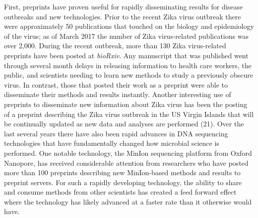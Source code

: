 \documentclass[11pt,]{article}
\begin{document}
First, preprints have proven useful for rapidly disseminating results
for disease outbreaks and new technologies. Prior to the recent Zika
virus outbreak there were approximately 50 publications that touched on
the biology and epidemiology of the virus; as of March 2017 the number
of Zika virus-related publications was over 2,000. During the recent
outbreak, more than 130 Zika virus-related preprints have been posted at
\emph{bioRxiv}. Any manuscript that was published went through several
month delays in releasing information to health care workers, the
public, and scientists needing to learn new methods to study a
previously obscure virus. In contrast, those that posted their work as a
preprint were able to disseminate their methods and results instantly.
Another interesting use of preprints to disseminate new information
about Zika virus has been the posting of a preprint describing the Zika
virus outbreak in the US Virgin Islands that will be continually updated
as new data and analyses are performed (21). Over the last several years
there have also been rapid advances in DNA sequencing technologies that
have fundamentally changed how microbial science is performed. One
notable technology, the MinIon sequencing platform from Oxford Nanopore,
has received considerable attention from researchers who have posted
more than 100 preprints describing new MinIon-based methods and results
to preprint servers. For such a rapidly developing technology, the
ability to share and consume methods from other scientists has created a
feed forward effect where the technology has likely advanced at a faster
rate than it otherwise would have.
\end{document}
